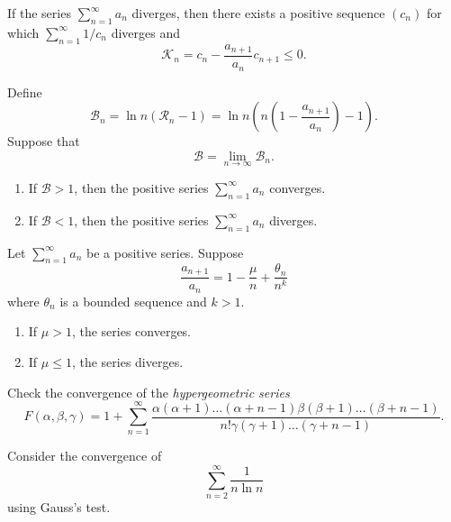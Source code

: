 \begin{theorem}
  If the series $\sum_{n = 1}^{\infty} a_n$ diverges, then there
  exists a positive sequence $(c_n)$ for which
  $\sum_{n = 1}^{\infty} 1/c_n$ diverges and
  \[ \mathcal{K}_n = c_n - \frac{a_{n + 1}}{a_n} c_{n + 1} \leq 0. \]
\end{theorem}

\begin{proposition}
  Define
  \[ \mathcal{B}_n = \ln n (\mathcal{R}_n - 1) = \ln n \left(n
      \left(1 - \frac{a_{n +
  1}}{a_n}\right) - 1\right). \]
  Suppose that
  \[ \mathcal{B} = \lim_{n \to \infty} \mathcal{B}_n. \]
  \begin{enumerate}
    \item If $\mathcal{B} > 1$, then the positive series $\sum_{n = 1}^{\infty}
      a_n$ converges.
    \item If $\mathcal{B} < 1$, then the positive series $\sum_{n = 1}^{\infty}
      a_n$ diverges.
  \end{enumerate}
\end{proposition}

\begin{proposition}
  Let $\sum_{n = 1}^{\infty} a_n$ be a positive series. Suppose
  \[ \frac{a_{n + 1}}{a_n} = 1 - \frac{\mu}{n} + \frac{\theta_n}{n^k} \]
  where $\theta_n$ is a bounded sequence and $k > 1$.
  \begin{enumerate}
    \item If $\mu > 1$, the series converges.
    \item If $\mu \leq 1$, the series diverges.
  \end{enumerate}
\end{proposition}

\begin{example}
  Check the convergence of the \textit{hypergeometric series}
  \[ F(\alpha, \beta, \gamma) = 1 + \sum_{n = 1}^{\infty}
    \frac{\alpha (\alpha + 1) \dots (\alpha + n - 1) \beta (\beta + 1)
  \dots (\beta + n - 1)}{n! \gamma (\gamma + 1) \dots (\gamma + n - 1)}. \]
\end{example}

\begin{example}
  Consider the convergence of
  \[ \sum_{n = 2}^{\infty} \frac{1}{n \ln n} \]
  using Gauss's test.
\end{example}

